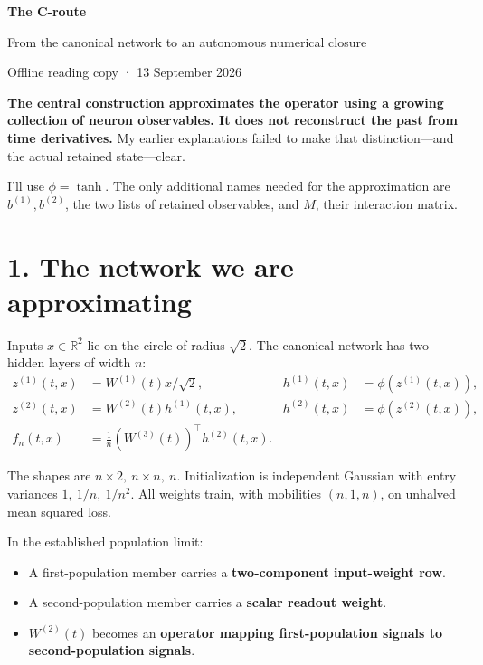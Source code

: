 \documentclass[11pt,a4paper]{scrartcl}
\begin{document}
\begin{center}
{\sffamily\bfseries\LARGE\color{inkblue} The C-route}\par\vspace{5pt}
{\sffamily\large From the canonical network to an autonomous numerical closure}\par\vspace{7pt}
{\small Offline reading copy · 13 September 2026}
\end{center}

\textbf{The central construction approximates the operator using a growing collection of neuron observables. It does not reconstruct the past from time derivatives.} My earlier explanations failed to make that distinction—and the actual retained state—clear.

I’ll use \(\phi=\tanh\). The only additional names needed for the approximation are \(b^{(1)},b^{(2)}\), the two lists of retained observables, and \(M\), their interaction matrix.

\section{1. The network we are approximating}

Inputs \(x\in\mathbb R^2\) lie on the circle of radius \(\sqrt2\). The canonical network has two hidden layers of width \(n\):
\[
\begin{aligned}
z^{(1)}(t,x)&=W^{(1)}(t)x/\sqrt2,
&h^{(1)}(t,x)&=\phi(z^{(1)}(t,x)),\\
z^{(2)}(t,x)&=W^{(2)}(t)h^{(1)}(t,x),
&h^{(2)}(t,x)&=\phi(z^{(2)}(t,x)),\\
f_n(t,x)&=\frac1n(W^{(3)}(t))^\top h^{(2)}(t,x).
\end{aligned}
\]

The shapes are \(n\times2,\ n\times n,\ n\). Initialization is independent Gaussian with entry variances \(1,\ 1/n,\ 1/n^2\). All weights train, with mobilities \((n,1,n)\), on unhalved mean squared loss.

In the established population limit:
\begin{itemize}
\item A first-population member carries a \textbf{two-component input-weight row}.
\item A second-population member carries a \textbf{scalar readout weight}.
\item \(W^{(2)}(t)\) becomes an \textbf{operator mapping first-population signals to second-population signals}.
\end{itemize}
\end{document}

